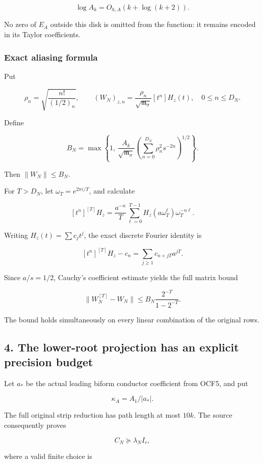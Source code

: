 \documentclass[11pt]{article}
\begin{document}
\[
\log A_k=O_{h,A}(k+\log(k+2)).
\]

No zero of \(E_A\) outside this disk is omitted from the function: it remains encoded in its Taylor coefficients.

\subsubsection{Exact aliasing formula}\label{exact-aliasing-formula}

Put

\[
\rho_n=\sqrt{\frac{n!}{(1/2)_n}},
\qquad
(W_N)_{z,n}
=
\frac{\rho_n}{\sqrt{\mathfrak m_\sigma}}[t^n]H_z(t),
\quad 0\le n\le D_N.
\]

Define

\[
B_N=
\max\left\{
1,\,
\frac{A_k}{\sqrt{\mathfrak m_\sigma}}
\left(\sum_{n=0}^{D_N}\rho_n^2s^{-2n}\right)^{1/2}
\right\}.
\tag{17}
\]

Then \(\|W_N\|\le B_N\).

For \(T>D_N\), let \(\omega_T=e^{2\pi i/T}\), and calculate

\[
[t^n]^{[T]}H_z
=
\frac{a^{-n}}T
\sum_{\ell=0}^{T-1}
H_z(a\omega_T^\ell)\omega_T^{-n\ell}.
\]

Writing \(H_z(t)=\sum c_jt^j\), the exact discrete Fourier identity is

\[
[t^n]^{[T]}H_z-c_n
=
\sum_{j\ge1}c_{n+jT}a^{jT}.
\]

Since \(a/s=1/2\), Cauchy's coefficient estimate yields the full matrix bound

\[
\boxed{
\|W_N^{[T]}-W_N\|
\le
B_N\frac{2^{-T}}{1-2^{-T}}.
}
\tag{18}
\]

The bound holds simultaneously on every linear combination of the original rows.

\subsection{4. The lower-root projection has an explicit precision budget}\label{the-lower-root-projection-has-an-explicit-precision-budget}

Let \(a_*\) be the actual leading biform conductor coefficient from OCF5, and put

\[
\kappa_A=A_1/|a_*|.
\]

The full original strip reduction has path length at most \(10k\). The source consequently proves

\[
C_N\succeq\lambda_N I_r,
\]

where a valid finite choice is
\end{document}
